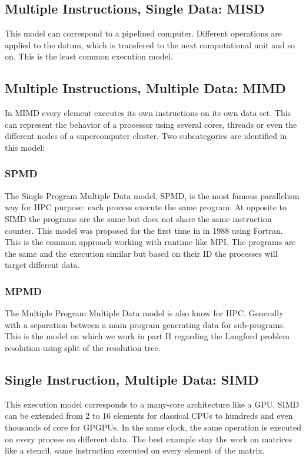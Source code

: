 \subsection{Multiple Instructions, Single Data: MISD}
This model can correspond to a pipelined computer.
Different operations are applied to the datum, which is transfered to the next computational unit and so on. 
This is the least common execution model.


\subsection{Multiple Instructions, Multiple Data: MIMD}
In MIMD every element executes its own instructions on its own data set. 
This can represent the behavior of a processor using several cores, threads or even the different nodes of a supercomputer cluster. 
Two subcategories are identified in this model:

\subsubsection{SPMD}
The Single Program Multiple Data model, SPMD, is the most famous parallelism way for HPC purpose: each process execute the same program. 
At opposite to SIMD the programs are the same but does not share the same instruction counter. 
This model was proposed for the first time in \cite{darema1988single} in 1988 using Fortran.
This is the common approach working with runtime like MPI. 
The programs are the same and the execution similar but based on their ID the processes will target different data. 

\subsubsection{MPMD}
The Multiple Program Multiple Data model is also know for HPC. 
Generally with a separation between a main program generating data for sub-programs. 
This is the model on which we work in part II regarding the Langford problem resolution using split of the resolution tree.

\subsection{Single Instruction, Multiple Data: SIMD}
This execution model corresponds to a many-core architecture like a GPU. 
SIMD can be extended from 2 to 16 elements for classical CPUs to hundreds and even thousands of core for GPGPUs. 
In the same clock, the same operation is executed on every process on different data. 
The best example stay the work on matrices like a stencil, same instruction executed on every element of the matrix. 

